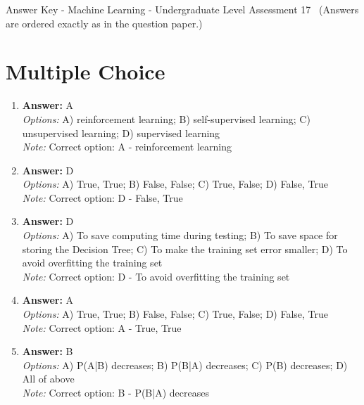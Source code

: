 \documentclass[12pt]{article}
\begin{document}
\begin{center}
Answer Key - Machine Learning - Undergraduate Level Assessment 17 \
\small (Answers are ordered exactly as in the question paper.)
\end{center}

\section*{Multiple Choice}
\begin{enumerate}[label=\arabic*.]
\item \textbf{Answer:} A
\\ \textit{Options:} A) reinforcement learning; B) self-supervised learning; C) unsupervised learning; D) supervised learning
\\ \textit{Note:} Correct option: A - reinforcement learning
\item \textbf{Answer:} D
\\ \textit{Options:} A) True, True; B) False, False; C) True, False; D) False, True
\\ \textit{Note:} Correct option: D - False, True
\item \textbf{Answer:} D
\\ \textit{Options:} A) To save computing time during testing; B) To save space for storing the Decision Tree; C) To make the training set error smaller; D) To avoid overfitting the training set
\\ \textit{Note:} Correct option: D - To avoid overfitting the training set
\item \textbf{Answer:} A
\\ \textit{Options:} A) True, True; B) False, False; C) True, False; D) False, True
\\ \textit{Note:} Correct option: A - True, True
\item \textbf{Answer:} B
\\ \textit{Options:} A) P(A|B) decreases; B) P(B|A) decreases; C) P(B) decreases; D) All of above
\\ \textit{Note:} Correct option: B - P(B|A) decreases
\end{enumerate}
\end{document}
